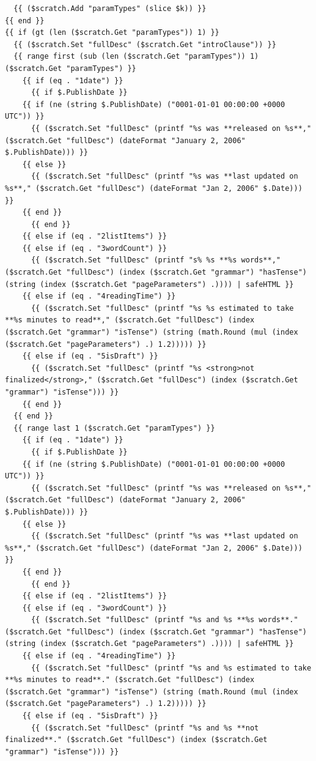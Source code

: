 \documentclass[11pt]{article}
\begin{document}
\begin{verbatim}
  {{ ($scratch.Add "paramTypes" (slice $k)) }}
{{ end }}
{{ if (gt (len ($scratch.Get "paramTypes")) 1) }}
  {{ ($scratch.Set "fullDesc" ($scratch.Get "introClause")) }}
  {{ range first (sub (len ($scratch.Get "paramTypes")) 1) ($scratch.Get "paramTypes") }}
    {{ if (eq . "1date") }}
      {{ if $.PublishDate }}
	{{ if (ne (string $.PublishDate) ("0001-01-01 00:00:00 +0000 UTC")) }}
	  {{ ($scratch.Set "fullDesc" (printf "%s was **released on %s**," ($scratch.Get "fullDesc") (dateFormat "January 2, 2006" $.PublishDate))) }}
	{{ else }}
	  {{ ($scratch.Set "fullDesc" (printf "%s was **last updated on %s**," ($scratch.Get "fullDesc") (dateFormat "Jan 2, 2006" $.Date))) }}
	{{ end }}
      {{ end }}
    {{ else if (eq . "2listItems") }}
    {{ else if (eq . "3wordCount") }}
      {{ ($scratch.Set "fullDesc" (printf "s% %s **%s words**," ($scratch.Get "fullDesc") (index ($scratch.Get "grammar") "hasTense") (string (index ($scratch.Get "pageParameters") .)))) | safeHTML }}
    {{ else if (eq . "4readingTime") }}
      {{ ($scratch.Set "fullDesc" (printf "%s %s estimated to take **%s minutes to read**," ($scratch.Get "fullDesc") (index ($scratch.Get "grammar") "isTense") (string (math.Round (mul (index ($scratch.Get "pageParameters") .) 1.2))))) }}
    {{ else if (eq . "5isDraft") }}
      {{ ($scratch.Set "fullDesc" (printf "%s <strong>not finalized</strong>," ($scratch.Get "fullDesc") (index ($scratch.Get "grammar") "isTense"))) }}
    {{ end }}
  {{ end }}
  {{ range last 1 ($scratch.Get "paramTypes") }}
    {{ if (eq . "1date") }}
      {{ if $.PublishDate }}
	{{ if (ne (string $.PublishDate) ("0001-01-01 00:00:00 +0000 UTC")) }}
	  {{ ($scratch.Set "fullDesc" (printf "%s was **released on %s**," ($scratch.Get "fullDesc") (dateFormat "January 2, 2006" $.PublishDate))) }}
	{{ else }}
	  {{ ($scratch.Set "fullDesc" (printf "%s was **last updated on %s**," ($scratch.Get "fullDesc") (dateFormat "Jan 2, 2006" $.Date))) }}
	{{ end }}
      {{ end }}
    {{ else if (eq . "2listItems") }}
    {{ else if (eq . "3wordCount") }}
      {{ ($scratch.Set "fullDesc" (printf "%s and %s **%s words**." ($scratch.Get "fullDesc") (index ($scratch.Get "grammar") "hasTense") (string (index ($scratch.Get "pageParameters") .)))) | safeHTML }}
    {{ else if (eq . "4readingTime") }}
      {{ ($scratch.Set "fullDesc" (printf "%s and %s estimated to take **%s minutes to read**." ($scratch.Get "fullDesc") (index ($scratch.Get "grammar") "isTense") (string (math.Round (mul (index ($scratch.Get "pageParameters") .) 1.2))))) }}
    {{ else if (eq . "5isDraft") }}
      {{ ($scratch.Set "fullDesc" (printf "%s and %s **not finalized**." ($scratch.Get "fullDesc") (index ($scratch.Get "grammar") "isTense"))) }}

\end{verbatim}
\end{document}
